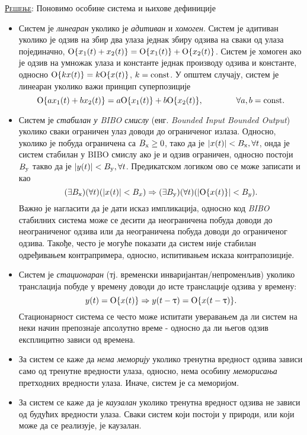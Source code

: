 \textsc{\underline{Решење}}:
Поновимо особине система и њихове дефиниције
\begin{itemize}
    \item Систем је \textit{линеаран} уколико је \textit{адитиван} и \textit{хомоген}. Систем је адитиван уколико је 
    одзив на збир два улаза једнак збиру одзива на сваки од улаза појединачно, 
    ${{\rm O}\{x_1(t) + x_2(t)\} = {\rm O}\{x_1(t)\} + {\rm O}\{x_2(t)\}}$.
    Систем је хомоген ако је
    одзив на умножак улаза и константе једнак производу одзива и константе, односно
    ${\rm O}\{kx(t)\} = k {\rm O}\{x(t)\}$, $k = \rm const$. У општем случају, систем је линеаран уколико важи принцип 
    суперпозиције 
    \begin{equation}
        {{\rm O}\{ax_1(t) + bx_2(t)\} = a{\rm O}\{x_1(t)\} + b{\rm O}\{x_2(t)\}}, \qquad \qquad \forall a,b = \rm const.
    \end{equation}
    \item Систем је \textit{стабилан у \textit{BIBO} смислу} (енг. \textit{Bounded Input Bounded Output}) 
    уколико сваки ограничен улаз доводи до ограниченог излаза. Односно, уколико је побуда ограничена са $B_{\rm x} \geq 0$,
    тако да је $|x(t)| < B_{\rm x}, \forall t$, онда је систем стабилан у BIBO смислу ако је и одзив ограничен, 
    односно постоји $B_{\rm y}$ такво да је $|y(t)| < B_{\rm y}, \forall t$. Предикатском логиком ово се може записати 
    и као 
    \begin{equation}
        (\exists B_{\rm x})(\forall t)( |x(t)| < B_x ) \Rightarrow
        (\exists B_{\rm y})(\forall t)( |{\rm O}\{x(t)\}| < B_y ).
    \end{equation}
    Важно је нагласити да је дати исказ импликација,
    односно код \textit{BIBO} стабилних система може се десити да неограничена побуда доводи до неограниченог одзива 
    или да неограничена побуда доводи до ограниченог одзива. Такође, често је могуће показати да систем није 
    стабилан одређивањем контрапримера, односно, испитивањем исказа контрапозиције.

    \item Систем је \textit{стационаран} (тј. временски инваријантан/непроменљив) уколико транслација побуде у времену 
    доводи до исте транслације одзива у времену: 
    \begin{equation}
        {y(t) = {\rm O}\{x(t)\} \Rightarrow y(t - \uptau) = {\rm O}\{x(t - \uptau)\}}.
    \end{equation}
    Стационарност система се често може испитати уверавањем да ли систем на неки начин препознаје апсолутно време - односно 
    да ли његов одзив експлицитно зависи од времена.
    \item За систем се каже да \textit{нема меморију} уколико тренутна вредност одзива зависи само од тренутне вредности улаза, односно, нема 
    особину \textit{меморисања} претходних вредности улаза. Иначе, систем је са меморијом. 

    \item За систем се каже да је  \textit{каузалан} уколико тренутна вредност одзива не зависи од будућих вредности улаза. 
    Сваки систем који постоји у природи, или који може да се реализује, је каузалан.
\end{itemize}

